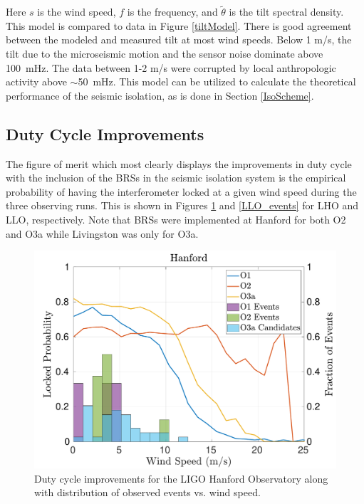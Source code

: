 \documentclass [12pt, proquest]{uwthesis}[2019]
\begin{document}
Here $s$ is the wind speed, $f$ is the frequency, and $\tilde{\theta}$ is the tilt spectral density. This model is compared to data in Figure \ref{tiltModel}. There is good agreement between the modeled and measured tilt at most wind speeds. Below 1 m/s, the tilt due to the microseismic motion and the sensor noise dominate above 100~mHz. The data between 1-2 m/s were corrupted by local anthropologic activity above $\sim$50~mHz. This model can be utilized to calculate the theoretical performance of the seismic isolation, as is done in Section \ref{IsoScheme}.

\subsection{Duty Cycle Improvements}

The figure of merit which most clearly displays the improvements in duty cycle with the inclusion of the BRSs in the seismic isolation system is the empirical probability of having the interferometer locked at a given wind speed during the three observing runs. This is shown in Figures \ref{LHO_events} and \ref{LLO_events} for LHO and LLO, respectively. Note that BRSs were implemented at Hanford for both O2 and O3a while Livingston was only for O3a.

\begin{figure}[!h]
\begin{center}
\includegraphics[width=\textwidth]{LHO_WindVsLockEvents.pdf}
\caption[Duty cycle improvements for the LIGO Hanford Observatory]{Duty cycle improvements for the LIGO Hanford Observatory along with distribution of observed events vs. wind speed. }
\label{LHO_events}
\end{center}
\end{figure}
\end{document}
